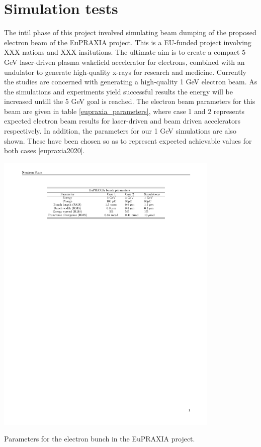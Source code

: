 \chapter{Simulation tests} %
The intil phase of this project involved simulating beam dumping of the proposed electron beam of the EuPRAXIA project. This is a EU-funded project involving XXX nations and XXX insitutions. The ultimate aim is to create a compact 5 GeV laser-driven plasma wakefield accelerator for electrons, combined with an undulator to generate high-quality x-rays for research and medicine. Currently the studies are concerned with generating a high-quality 1 GeV electron beam. As the simulations and experiments yield successful results the energy will be increased untill the 5 GeV goal is reached. The electron beam parameters for this beam are given in table \ref{eupraxia_parameters}, where case 1 and 2 represents expected electron beam results for laser-driven and beam driven accelerators respectively.  In addition, the parameters for our 1 GeV simulations are also shown. These have been chosen so as to represent expected achievable values for both cases [eupraxia2020]. 
\begin{table}[ht!]
\centering
\includegraphics[width=0.8\textwidth]{table.pdf}
\caption{Parameters for the electron bunch in the EuPRAXIA project.}
\label{eupraxia_parameters}
\end{table}
